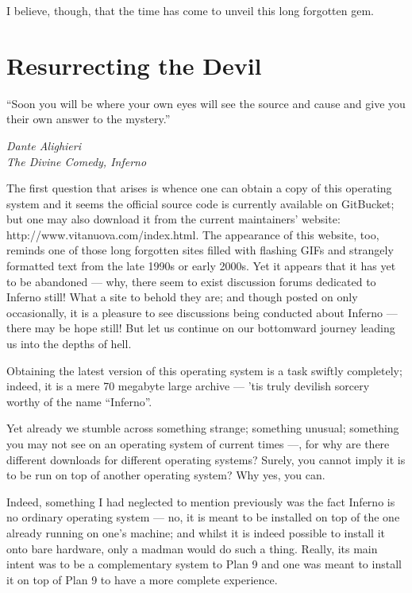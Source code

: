 \documentclass[a5paper,twoside,12pt]{report}
\begin{document}
I believe, though, that the time has come to unveil this long forgotten gem. \newpage

\chapter*{Resurrecting the Devil}

  \epigraph{``Soon you will be where your own eyes will see the source and cause and give you their own answer to the mystery.''}{\textit{Dante Alighieri\\The Divine Comedy, Inferno}}

The first question that arises is whence one can obtain a copy of this operating system and it seems the official source code is currently available on GitBucket; but one may also download it from the current maintainers' website: http://www.vitanuova.com/index.html. The appearance of this website, too, reminds one of those long forgotten sites filled with flashing GIFs and strangely formatted text from the late 1990s or early 2000s. Yet it appears that it has yet to be abandoned — why, there seem to exist discussion forums dedicated to Inferno still! What a site to behold they are; and though posted on only occasionally, it is a pleasure to see discussions being conducted about Inferno — there may be hope still! But let us continue on our bottomward journey leading us into the depths of hell.

Obtaining the latest version of this operating system is a task swiftly completely; indeed, it is a mere 70 megabyte large archive — 'tis truly devilish sorcery worthy of the name  ``Inferno''.

Yet already we stumble across something strange; something unusual; something you may not see on an operating system of current times —, for why are there different downloads for different operating systems? Surely, you cannot imply it is to be run on top of another operating system? Why yes, you can.

Indeed, something I had neglected to mention previously was the fact Inferno is no ordinary operating system — no, it is meant to be installed on top of the one already running on one's machine; and whilst it is indeed possible to install it onto bare hardware, only a madman would do such a thing. Really, its main intent was to be a complementary system to Plan 9 and one was meant to install it on top of Plan 9 to have a more complete experience.
\end{document}
